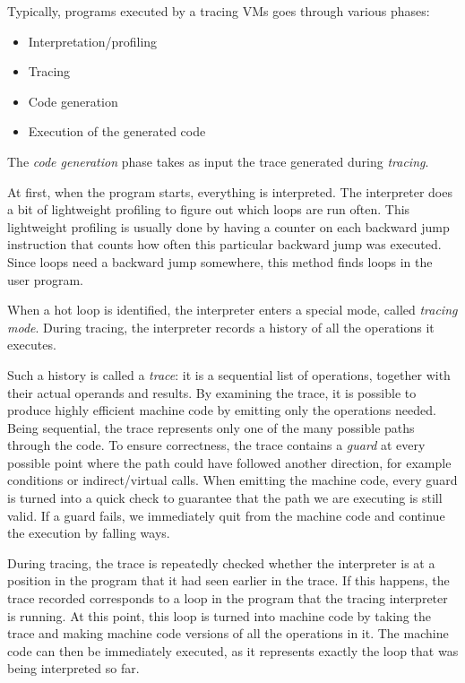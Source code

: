 \documentclass{acm_proc_article-sp}
\begin{document}
Typically, programs executed by a tracing VMs goes through various phases:

\begin{itemize}
\item Interpretation/profiling
\item Tracing
\item Code generation
\item Execution of the generated code
\end{itemize}

The \emph{code generation} phase takes as input the trace generated during
\emph{tracing}.

At first, when the program starts, everything is interpreted.
The interpreter does a bit of lightweight profiling to figure out which loops
are run often. This lightweight profiling is usually done by having a counter on
each backward jump instruction that counts how often this particular backward jump
was executed. Since loops need a backward jump somewhere, this method finds
loops in the user program.

When a hot loop is identified, the interpreter enters a
special mode, called \emph{tracing mode}. During tracing, the interpreter
records a history of all the operations it executes.

Such a history is called a \emph{trace}: it is a sequential list of
operations, together with their actual operands and results.  By examining the
trace, it is possible to produce highly efficient machine code by emitting
only the operations needed.  Being sequential, the trace represents only one
of the many possible paths through the code. To ensure correctness, the trace
contains a \emph{guard} at every possible point where the path could have
followed another direction, for example conditions or indirect/virtual
calls.  When emitting the machine code, every guard is turned into a quick check
to guarantee that the path we are executing is still valid.  If a guard fails,
we immediately quit from the machine code and continue the execution by falling
ways.  

During tracing, the trace is repeatedly
checked whether the interpreter is at a position in the program that it had seen
earlier in the trace. If this happens, the trace recorded corresponds to a loop
in the program that the tracing interpreter is running. At this point, this loop
is turned into machine code by taking the trace and making machine code versions
of all the operations in it. The machine code can then be immediately executed,
as it represents exactly the loop that was being interpreted so far.
\end{document}
